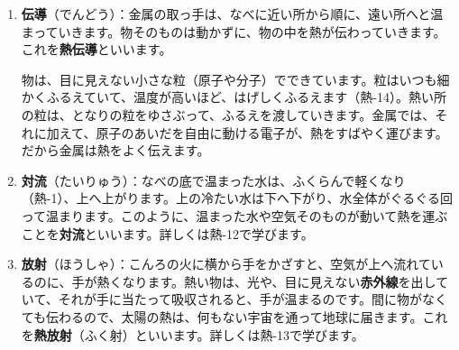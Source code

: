 \begin{enumerate}[label={\bkcircled{\arabic*}}, leftmargin=2.4\zw, itemsep=2pt, topsep=2pt]
\item \label{ph:熱-11:kinzoku}\textbf{伝導}（でんどう）：金属の取っ手は、なべに近い所から順に、遠い所へと温まっていきます。物そのものは動かずに、物の中を熱が伝わっていきます。これを\textbf{熱伝導}といいます。

物は、目に見えない小さな粒（原子や分子）でできています。粒はいつも細かくふるえていて、温度が高いほど、はげしくふるえます（熱-14）。熱い所の粒は、となりの粒をゆさぶって、ふるえを渡していきます。金属では、それに加えて、原子のあいだを自由に動ける電子が、熱をすばやく運びます。だから金属は熱をよく伝えます。

\item \textbf{対流}（たいりゅう）：なべの底で温まった水は、ふくらんで軽くなり（熱-1）、上へ上がります。上の冷たい水は下へ下がり、水全体がぐるぐる回って温まります。このように、温まった水や空気そのものが動いて熱を運ぶことを\textbf{対流}といいます。詳しくは熱-12で学びます。

\item \textbf{放射}（ほうしゃ）：こんろの火に横から手をかざすと、空気が上へ流れているのに、手が熱くなります。熱い物は、光や、目に見えない\textbf{赤外線}を出していて、それが手に当たって吸収されると、手が温まるのです。間に物がなくても伝わるので、太陽の熱は、何もない宇宙を通って地球に届きます。これを\textbf{熱放射}（ふく射）といいます。詳しくは熱-13で学びます。
\end{enumerate}

